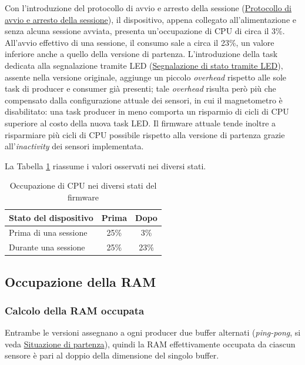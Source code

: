 Con l'introduzione del protocollo di avvio e arresto della sessione
(\hyperref[sec:avvio-arresto]{Protocollo di avvio e arresto della
sessione}), il dispositivo, appena collegato all'alimentazione e senza
alcuna sessione avviata, presenta un'occupazione di CPU di circa il 3\%.
All'avvio effettivo di una sessione, il consumo sale a circa il 23\%, un
valore inferiore anche a quello della versione di partenza. L'introduzione
della task dedicata alla segnalazione tramite LED
(\hyperref[sec:led]{Segnalazione di stato tramite LED}), assente nella
versione originale, aggiunge un piccolo \textit{overhead} rispetto alle sole
task di producer e consumer già presenti; tale \textit{overhead} risulta però
più che compensato dalla configurazione attuale dei sensori, in cui il
magnetometro è disabilitato: una task producer in meno comporta un risparmio
di cicli di CPU superiore al costo della nuova task LED. Il firmware attuale
tende inoltre a risparmiare più cicli di CPU possibile rispetto alla
versione di partenza grazie all'\textit{inactivity} dei sensori implementata.

La Tabella \ref{tab:cpu-occupazione} riassume i valori osservati nei diversi
stati.

\begin{table}[H]
    \centering
    \begin{tabular}{p{7.5cm} c c}
        \hline
        \textbf{Stato del dispositivo} & \textbf{Prima} & \textbf{Dopo} \\
        \hline
        Prima di una sessione & 25\% & 3\% \\
        Durante una sessione & 25\% & 23\% \\
        \hline
    \end{tabular}
    \caption{Occupazione di CPU nei diversi stati del firmware}
    \label{tab:cpu-occupazione}
\end{table}


\subsection{Occupazione della RAM}
\label{subsubsec:ram-occupazione}

\subsubsection{Calcolo della RAM occupata}
Entrambe le versioni assegnano a ogni producer due buffer alternati
(\textit{ping-pong}, si veda \hyperref[sec:situazione-partenza]{Situazione
di partenza}), quindi la RAM effettivamente occupata da ciascun
sensore è pari al doppio della dimensione del singolo buffer.

